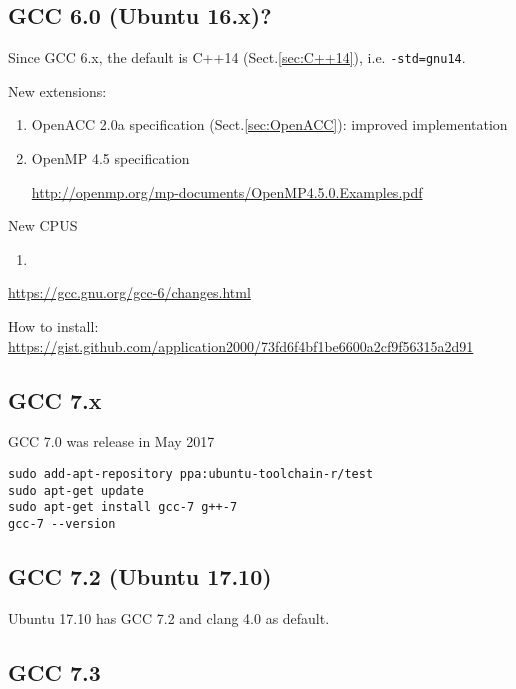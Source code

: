 
\subsection{GCC 6.0 (Ubuntu 16.x)?}
\label{sec:GCC-6.0}

Since GCC 6.x, the default is C++14 (Sect.\ref{sec:C++14}), i.e.
\verb!-std=gnu14!.

New extensions:
\begin{enumerate}
  \item OpenACC 2.0a specification (Sect.\ref{sec:OpenACC}): improved
  implementation
  
  \item OpenMP 4.5 specification
  
  \url{http://openmp.org/mp-documents/OpenMP4.5.0.Examples.pdf}  
\end{enumerate}

New CPUS
\begin{enumerate}
  
  \item 
\end{enumerate}

\url{https://gcc.gnu.org/gcc-6/changes.html}


How to install:
\url{https://gist.github.com/application2000/73fd6f4bf1be6600a2cf9f56315a2d91}


\subsection{GCC 7.x}

GCC 7.0 was release in May 2017

\begin{verbatim}
sudo add-apt-repository ppa:ubuntu-toolchain-r/test
sudo apt-get update
sudo apt-get install gcc-7 g++-7
gcc-7 --version
\end{verbatim}


\subsection{GCC 7.2 (Ubuntu 17.10)}

Ubuntu 17.10 has GCC 7.2 and clang 4.0 as default.

\subsection{GCC 7.3}

